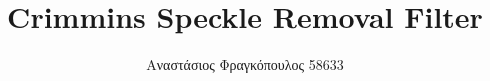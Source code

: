 \documentclass[12pt]{article}
\begin{document}
\title{Crimmins Speckle Removal Filter}
\author{Αναστάσιος Φραγκόπουλος 58633}
\date{}




\tableofcontents
\newpage







\vspace{1.5em}
\nocite{*}
\printbibliography
{}
\end{document}
